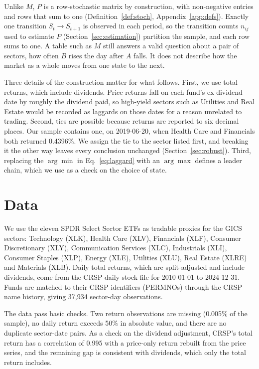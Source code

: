 \documentclass[11pt]{article}
\begin{document}
Unlike $M$, $P$ is a row-stochastic matrix by construction, with non-negative entries and rows that sum to one (Definition~\ref{def:stoch}, Appendix~\ref{app:defs}). Exactly one transition $S_t \to S_{t+1}$ is observed in each period, so the transition counts $n_{ij}$ used to estimate $P$ (Section~\ref{sec:estimation}) partition the sample, and each row sums to one. A table such as $M$ still answers a valid question about a pair of sectors, how often $B$ rises the day after $A$ falls. It does not describe how the market as a whole moves from one state to the next.

Three details of the construction matter for what follows. First, we use total returns, which include dividends. Price returns fall on each fund's ex-dividend date by roughly the dividend paid, so high-yield sectors such as Utilities and Real Estate would be recorded as laggards on those dates for a reason unrelated to trading. Second, ties are possible because returns are reported to six decimal places. Our sample contains one, on 2019-06-20, when Health Care and Financials both returned 0.4396\%. We assign the tie to the sector listed first, and breaking it the other way leaves every conclusion unchanged (Section~\ref{sec:robust}). Third, replacing the $\arg\min$ in Eq.~\eqref{eq:laggard} with an $\arg\max$ defines a leader chain, which we use as a check on the choice of state.

\clearpage
\section{Data}
\label{sec:data}

We use the eleven SPDR Select Sector ETFs as tradable proxies for the GICS sectors: Technology (XLK), Health Care (XLV), Financials (XLF), Consumer Discretionary (XLY), Communication Services (XLC), Industrials (XLI), Consumer Staples (XLP), Energy (XLE), Utilities (XLU), Real Estate (XLRE) and Materials (XLB). Daily total returns, which are split-adjusted and include dividends, come from the CRSP daily stock file \cite{crsp} for 2010-01-01 to 2024-12-31. Funds are matched to their CRSP identifiers (PERMNOs) through the CRSP name history, giving 37{,}934 sector-day observations.

The data pass basic checks. Two return observations are missing (0.005\% of the sample), no daily return exceeds 50\% in absolute value, and there are no duplicate sector-date pairs. As a check on the dividend adjustment, CRSP's total return has a correlation of 0.995 with a price-only return rebuilt from the price series, and the remaining gap is consistent with dividends, which only the total return includes.
\end{document}
